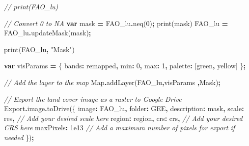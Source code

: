 \documentclass[
  10pt,
  b5paper,
  oneside]{book}
\newenvironment{Shaded}{\begin{snugshade}}{\end{snugshade}}
\newcommand{\AttributeTok}[1]{\textcolor[rgb]{0.77,0.63,0.00}{#1}}
\newcommand{\BuiltInTok}[1]{#1}
\newcommand{\CommentTok}[1]{\textcolor[rgb]{0.56,0.35,0.01}{\textit{#1}}}
\newcommand{\DataTypeTok}[1]{\textcolor[rgb]{0.13,0.29,0.53}{#1}}
\newcommand{\DecValTok}[1]{\textcolor[rgb]{0.00,0.00,0.81}{#1}}
\newcommand{\FloatTok}[1]{\textcolor[rgb]{0.00,0.00,0.81}{#1}}
\newcommand{\FunctionTok}[1]{\textcolor[rgb]{0.00,0.00,0.00}{#1}}
\newcommand{\KeywordTok}[1]{\textcolor[rgb]{0.13,0.29,0.53}{\textbf{#1}}}
\newcommand{\NormalTok}[1]{#1}
\newcommand{\OperatorTok}[1]{\textcolor[rgb]{0.81,0.36,0.00}{\textbf{#1}}}
\newcommand{\StringTok}[1]{\textcolor[rgb]{0.31,0.60,0.02}{#1}}
\begin{document}
\begin{Shaded}
\begin{Highlighting}[]
\CommentTok{// print(FAO\_lu)}

\CommentTok{// Convert 0 to NA}
\KeywordTok{var}\NormalTok{ mask }\OperatorTok{=}\NormalTok{ FAO\_lu}\OperatorTok{.}\FunctionTok{neq}\NormalTok{(}\DecValTok{0}\NormalTok{)}\OperatorTok{;}
\FunctionTok{print}\NormalTok{(mask)}
\NormalTok{FAO\_lu }\OperatorTok{=}\NormalTok{ FAO\_lu}\OperatorTok{.}\FunctionTok{updateMask}\NormalTok{(mask)}\OperatorTok{;}

\FunctionTok{print}\NormalTok{(FAO\_lu}\OperatorTok{,} \StringTok{"Mask"}\NormalTok{)}

\KeywordTok{var}\NormalTok{ visParams }\OperatorTok{=}\NormalTok{ \{}
  \DataTypeTok{bands}\OperatorTok{:} \StringTok{\textquotesingle{}remapped\textquotesingle{}}\OperatorTok{,}
  \DataTypeTok{min}\OperatorTok{:} \DecValTok{0}\OperatorTok{,}
  \DataTypeTok{max}\OperatorTok{:} \DecValTok{1}\OperatorTok{,}
  \DataTypeTok{palette}\OperatorTok{:}\NormalTok{ [}\StringTok{\textquotesingle{}green\textquotesingle{}}\OperatorTok{,} \StringTok{\textquotesingle{}yellow\textquotesingle{}}\NormalTok{]}
\NormalTok{\}}\OperatorTok{;}

\CommentTok{// Add the layer to the map}
\BuiltInTok{Map}\OperatorTok{.}\FunctionTok{addLayer}\NormalTok{(FAO\_lu}\OperatorTok{,}\NormalTok{visParams }\OperatorTok{,}\StringTok{\textquotesingle{}Mask\textquotesingle{}}\NormalTok{)}\OperatorTok{;}

\CommentTok{// Export the land cover image as a raster to Google Drive}
\NormalTok{Export}\OperatorTok{.}\AttributeTok{image}\OperatorTok{.}\FunctionTok{toDrive}\NormalTok{(\{}
  \DataTypeTok{image}\OperatorTok{:}\NormalTok{ FAO\_lu}\OperatorTok{,}
  \DataTypeTok{folder}\OperatorTok{:} \StringTok{\textquotesingle{}GEE\textquotesingle{}}\OperatorTok{,}
  \DataTypeTok{description}\OperatorTok{:} \StringTok{\textquotesingle{}mask\textquotesingle{}}\OperatorTok{,}
  \DataTypeTok{scale}\OperatorTok{:}\NormalTok{ res}\OperatorTok{,} \CommentTok{// Add your desired scale here}
  \DataTypeTok{region}\OperatorTok{:}\NormalTok{ region}\OperatorTok{,}
  \DataTypeTok{crs}\OperatorTok{:}\NormalTok{ crs}\OperatorTok{,} \CommentTok{// Add your desired CRS here}
  \DataTypeTok{maxPixels}\OperatorTok{:} \FloatTok{1e13} \CommentTok{// Add a maximum number of pixels for export if needed}
\NormalTok{\})}\OperatorTok{;}
\end{Highlighting}
\end{Shaded}
\end{document}
